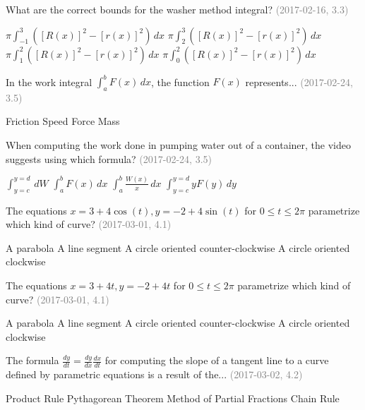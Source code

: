 \documentclass[12pt]{exam}
\newcommand{\questionDate}[1]{\textcolor{gray}{(#1)}}
\newcommand{\<}{\langle}
\renewcommand{\>}{\rangle}
\begin{document}
\begin{questions}
  \question
   What are the correct bounds for the washer method integral?
  \questionDate{2017-02-16, 3.3}
  \begin{choices}
    \choice
      \(\pi\int_{-1}^3([R(x)]^2-[r(x)]^2)\,dx\)
    \choice
      \(\pi\int_2^3([R(x)]^2-[r(x)]^2)\,dx\)
    \CorrectChoice
      \(\pi\int_1^2([R(x)]^2-[r(x)]^2)\,dx\)
    \choice
      \(\pi\int_0^2([R(x)]^2-[r(x)]^2)\,dx\)
  \end{choices}

\newpage

  \question
  In the work integral \(\int_a^b F(x)\,dx\), the function \(F(x)\)
  represents...
  \questionDate{2017-02-24, 3.5}
  \begin{choices}
    \choice
      Friction
    \choice
      Speed
    \CorrectChoice
      Force
    \choice
      Mass
  \end{choices}

  \question
  When computing the work done in pumping water out of a container,
  the video suggests using which formula?
  \questionDate{2017-02-24, 3.5}
  \begin{choices}
    \CorrectChoice
      \(\int_{y=c}^{y=d}\,dW\)
    \choice
      \(\int_a^b F(x)\,dx\)
    \choice
      \(\int_a^b \frac{W(x)}{x}\,dx\)
    \choice
      \(\int_{y=c}^{y=d}yF(y)\,dy\)
  \end{choices}

\newpage

  \question
  The equations \(x=3+4\cos(t),y=-2+4\sin(t)\) for \(0\leq t\leq 2\pi\)
  parametrize which kind of curve?
  \questionDate{2017-03-01, 4.1}
  \begin{choices}
    \choice
      A parabola
    \choice
      A line segment
    \CorrectChoice
      A circle oriented counter-clockwise
    \choice
      A circle oriented clockwise
  \end{choices}

  \question
  The equations \(x=3+4t,y=-2+4t\) for \(0\leq t\leq 2\pi\)
  parametrize which kind of curve?
  \questionDate{2017-03-01, 4.1}
  \begin{choices}
    \choice
      A parabola
    \choice
      A line segment
    \CorrectChoice
      A circle oriented counter-clockwise
    \choice
      A circle oriented clockwise
  \end{choices}

\newpage

  \question
  The formula \(\frac{dy}{dt}=\frac{dy}{dx}\frac{dx}{dt}\) for computing the
  slope of a tangent line to a curve defined by parametric equations is
  a result of the...
  \questionDate{2017-03-02, 4.2}
  \begin{choices}
    \choice
      Product Rule
    \choice
      Pythagorean Theorem
    \choice
      Method of Partial Fractions
    \CorrectChoice
      Chain Rule
  \end{choices}


\end{questions}
\end{document}
